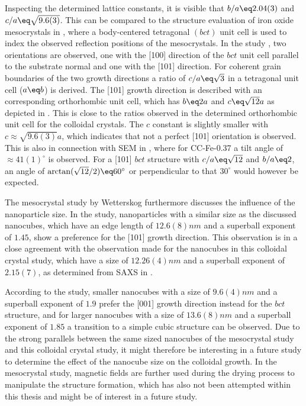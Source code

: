 \documentclass[\main/dresen_thesis.tex]{subfiles}
\begin{document}
  Inspecting the determined lattice constants, it is visible that $b/a \eq 2.04(3)$ and $c/a \eq \sqrt{9.6(3)}$.
  This can be compared to the structure evaluation of iron oxide mesocrystals in \cite{Wetterskog_2016_Tunin}, where a body-centered tetragonal $(bct)$ unit cell is used to index the observed reflection positions of the mesocrystals.
  In the study \cite{Wetterskog_2016_Tunin}, two orientations are observed, one with the [100] direction of the $bct$ unit cell parallel to the substrate normal and one with the [101] direction.
  For coherent grain boundaries of the two growth directions a ratio of $c/a \eq \sqrt{3}$ in a tetragonal unit cell ($a \eq b$) is derived.
  The [101] growth direction is described with an corresponding orthorhombic unit cell, which has $b \eq 2 a$ and $c \eq \sqrt{12} a$ as depicted in .
  This is close to the ratios observed in the determined orthorhombic unit cell for the colloidal crystals.
  The $c$ constant is slightly smaller with $c \approx \sqrt{9.6(3)} a$, which indicates that not a perfect [101] orientation is observed.
  This is also in connection with SEM in , where for CC-Fe-0.37 a tilt angle of $\approx 41(1) ^\circ$ is observed.
  For a [101] $bct$ structure with $c/a \eq \sqrt{12}$ and $b/a \eq 2$, an angle of $\arctan(\sqrt{12}/2) \eq 60 ^\circ$ or perpendicular to that $30^\circ$ would however be expected.

  The mesocrystal study by Wetterskog \etal \cite{Wetterskog_2016_Tunin} furthermore discusses the influence of the nanoparticle size.
  In the study, nanoparticles with a similar size as the discussed nanocubes, which have an edge length of $12.6(8) \unit{nm}$ and a superball exponent of $1.45$, show a preference for the [101] growth direction.
  This observation is in a close agreement with the observation made for the nanocubes in this colloidal crystal study, which have a size of $12.26(4) \unit{nm}$ and a superball exponent of $2.15(7)$, as determined from SAXS in .

  According to the study, smaller nanocubes with a size of $9.6(4) \unit{nm}$ and a superball exponent of $1.9$ prefer the [001] growth direction instead for the $bct$ structure, and for larger nanocubes with a size of $13.6(8) \unit{nm}$ and a superball exponent of $1.85$ a transition to a simple cubic structure can be observed.
  Due to the strong parallels between the same sized nanocubes of the mesocrystal study and this colloidal crystal study, it might therefore be interesting in a future study to determine the effect of the nanocube size on the colloidal growth.
  In the mesocrystal study, magnetic fields are further used during the drying process to manipulate the structure formation, which has also not been attempted within this thesis and might be of interest in a future study.
\end{document}
